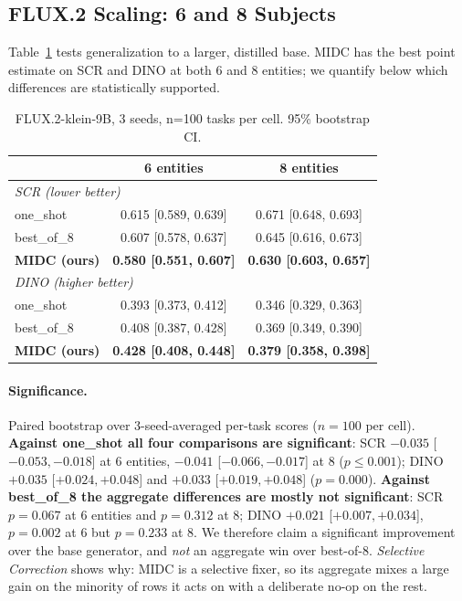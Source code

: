 \documentclass[letterpaper]{article}
\begin{document}
\subsection{FLUX.2 Scaling: 6 and 8 Subjects}
\label{sec:scaling}

Table~\ref{tab:flux2} tests generalization to a larger, distilled base. MIDC has the best point estimate on SCR and DINO at both 6 and 8 entities; we quantify below which differences are statistically supported.

\begin{table}[t]
\centering
\small
\begin{tabular}{lcc}
\toprule
& 6 entities & 8 entities \\
\midrule
\multicolumn{3}{l}{\textit{SCR (lower better)}} \\
\midrule
one\_shot & 0.615 [0.589, 0.639] & 0.671 [0.648, 0.693] \\
best\_of\_8 & 0.607 [0.578, 0.637] & 0.645 [0.616, 0.673] \\
\textbf{MIDC (ours)} & \textbf{0.580 [0.551, 0.607]} & \textbf{0.630 [0.603, 0.657]} \\
\midrule
\multicolumn{3}{l}{\textit{DINO (higher better)}} \\
\midrule
one\_shot & 0.393 [0.373, 0.412] & 0.346 [0.329, 0.363] \\
best\_of\_8 & 0.408 [0.387, 0.428] & 0.369 [0.349, 0.390] \\
\textbf{MIDC (ours)} & \textbf{0.428 [0.408, 0.448]} & \textbf{0.379 [0.358, 0.398]} \\
\bottomrule
\end{tabular}
\caption{FLUX.2-klein-9B, 3 seeds, n=100 tasks per cell. 95\% bootstrap CI.}
\label{tab:flux2}
\end{table}

\paragraph{Significance.} Paired bootstrap over 3-seed-averaged per-task scores ($n{=}100$ per cell). \textbf{Against one\_shot all four comparisons are significant}: SCR $-0.035$ [$-0.053,-0.018$] at 6 entities, $-0.041$ [$-0.066,-0.017$] at 8 ($p{\le}0.001$); DINO $+0.035$ [$+0.024,+0.048$] and $+0.033$ [$+0.019,+0.048$] ($p{=}0.000$). \textbf{Against best\_of\_8 the aggregate differences are mostly not significant}: SCR $p{=}0.067$ at 6 entities and $p{=}0.312$ at 8; DINO $+0.021$ [$+0.007,+0.034$], $p{=}0.002$ at 6 but $p{=}0.233$ at 8. We therefore claim a significant improvement over the base generator, and \emph{not} an aggregate win over best-of-8. \emph{Selective Correction} shows why: MIDC is a selective fixer, so its aggregate mixes a large gain on the minority of rows it acts on with a deliberate no-op on the rest.
\end{document}
